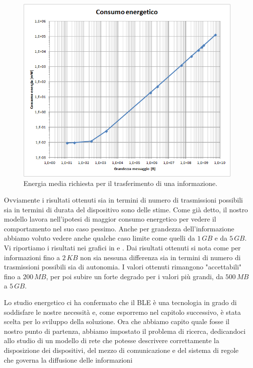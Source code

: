 \begin{figure}[t]
	\centering
	\includegraphics[width=0.8\linewidth]{Images/studio_energetico/cons_en_sing_tx_02}
	\caption[Studio energetico]{Energia media richiesta per il trasferimento di una informazione.}
	\label{fig:cons_en_sing_tx_02}
\end{figure}
Ovviamente i risultati ottenuti sia in termini di numero di trasmissioni possibili sia in termini di durata del dispositivo sono delle stime. Come già detto, il nostro modello lavora nell'ipotesi di maggior consumo energetico per vedere il comportamento nel suo caso pessimo. Anche per grandezza dell'informazione abbiamo voluto vedere anche qualche caso limite come quelli da $1\,GB$ e da $5\,GB$. Vi riportiamo i risultati nei grafici in  e . Dai risultati ottenuti si nota come per informazioni fino a $2\,KB$ non sia nessuna differenza sia in termini di numero di trasmissioni possibili sia di autonomia. I valori ottenuti rimangono "accettabili" fino a $200\,MB$, per poi subire un forte degrado per i valori più grandi, da $500\,MB$ a $5\,GB$.

Lo studio energetico ci ha confermato che il BLE è una tecnologia in grado di soddisfare le nostre necessità e, come esporremo nel capitolo successivo, è stata scelta per lo sviluppo della soluzione. Ora che abbiamo capito quale fosse il nostro punto di partenza, abbiamo impostato il problema di ricerca, dedicandoci allo studio di un modello di rete che potesse descrivere correttamente la disposizione dei dispositivi, del mezzo di comunicazione e del sistema di regole che governa la diffusione delle informazioni

